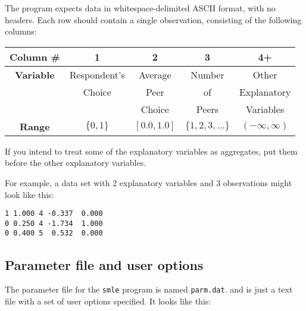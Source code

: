 \documentclass{article}
\begin{document}
The program expects data in whitespace-delimited ASCII format, with
no headers.  Each row should contain a single observation,
consisting of the following columns:
\begin{center}
\begin{tabular}{|c|c|c|c|c|}
\hline
{\footnotesize {\bf Column \# }} & {\footnotesize 1} & {\footnotesize 2} & {\footnotesize 3} & {\footnotesize 4+} \\ 
\hline
{\footnotesize {\bf Variable }} & {\footnotesize Respondent's} & {\footnotesize Average} & {\footnotesize Number} & {\footnotesize Other} \\
                & {\footnotesize Choice}       & {\footnotesize Peer}    & {\footnotesize of}     & {\footnotesize Explanatory}  \\
				        &              & {\footnotesize Choice}  & {\footnotesize Peers}  & {\footnotesize Variables} \\
\hline
{\footnotesize {\bf Range }} & {\footnotesize $\{0,1\}$} & {\footnotesize $[0.0,1.0]$} & {\footnotesize $\{1,2,3,\ldots\}$} & {\footnotesize $(-\infty,\infty)$} \\
\hline
\end{tabular}
\end{center}
If you intend to treat some of the explanatory variables as aggregates, put them 
before the other explanatory variables.

For example, a data set with 2 explanatory variables and 3 observations might
look like this:
{\scriptsize
\begin{verbatim}
1 1.000 4 -0.337  0.000
0 0.250 4 -1.734  1.000
0 0.400 5  0.532  0.000
\end{verbatim}
}


\subsection{Parameter file and user options}

The parameter file for the {\tt smle} program is named {\tt parm.dat}.
and is just a text file with a set of user options specified.  
It looks like this:
\end{document}
